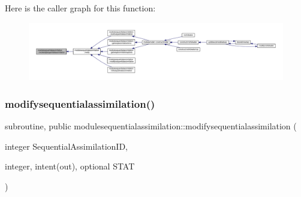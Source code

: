 Here is the caller graph for this function\+:\nopagebreak
\begin{figure}[H]
\begin{center}
\leavevmode
\includegraphics[width=350pt]{namespacemodulesequentialassimilation_a1d6ec9ce245a5aa2d80e8f35b8142e21_icgraph}
\end{center}
\end{figure}
\mbox{\label{namespacemodulesequentialassimilation_a4b01359595340ca852b276b1258601df}} 
\subsubsection{\texorpdfstring{modifysequentialassimilation()}{modifysequentialassimilation()}}
{\footnotesize\ttfamily subroutine, public modulesequentialassimilation\+::modifysequentialassimilation (\begin{DoxyParamCaption}\item[{integer}]{Sequential\+Assimilation\+ID,  }\item[{integer, intent(out), optional}]{S\+T\+AT }\end{DoxyParamCaption})}


